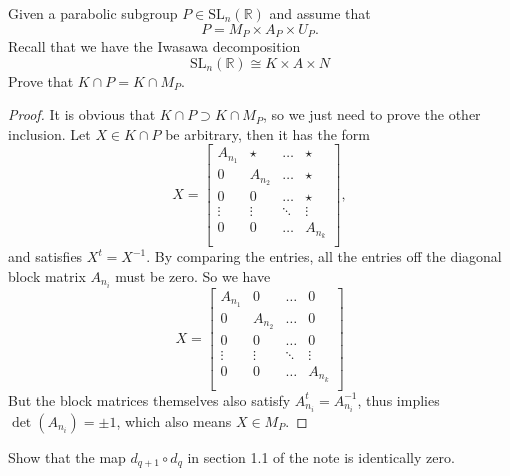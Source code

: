 \documentclass[12pt]{article} %
\begin{document}
\begin{tcolorbox}[colback=blue!5!white,colframe=blue!75!black,title=Problem 4]
  Given a parabolic subgroup $P \in \text{SL}_n(\mathbb{R})$ and assume that
  \[P = M_P \times A_P \times U_P.\]
  Recall that we have the Iwasawa decomposition
  \[ \text{SL}_n(\mathbb{R}) \cong K \times A \times N\]
  Prove that $K \cap P = K \cap M_P$.
\end{tcolorbox}
\begin{proof}
  It is obvious that $K \cap P \supset K \cap M_P$, so we just need to prove the other inclusion. Let $X \in K \cap P$
  be arbitrary, then it has the form
  \[X = \begin{bmatrix}
      A_{n_1} & \star   & \ldots & \star   \\
      0       & A_{n_2} & \ldots & \star   \\
      0       & 0       & \ldots & \star   \\
      \vdots  & \vdots  & \ddots & \vdots  \\
      0       & 0       & \ldots & A_{n_k} \\
    \end{bmatrix},\]
  and satisfies $X^t = X^{-1}$. By comparing the entries, all the entries off the diagonal block matrix $A_{n_i}$
  must be zero. So we have
  \[X = \begin{bmatrix}
      A_{n_1} & 0       & \ldots & 0       \\
      0       & A_{n_2} & \ldots & 0       \\
      0       & 0       & \ldots & 0       \\
      \vdots  & \vdots  & \ddots & \vdots  \\
      0       & 0       & \ldots & A_{n_k} \\
    \end{bmatrix}\]
  But the block matrices themselves also satisfy $A_{n_i}^t = A_{n_i}^{-1}$, thus implies
  $\det(A_{n_i}) = \pm 1$, which also means $X \in M_P.$
\end{proof}
\begin{tcolorbox}[colback=blue!5!white,colframe=blue!75!black,title=Problem 5]
  Show that the map $d_{q+1} \circ d_q$ in section 1.1 of the note is identically zero.
\end{tcolorbox}
\end{document}
